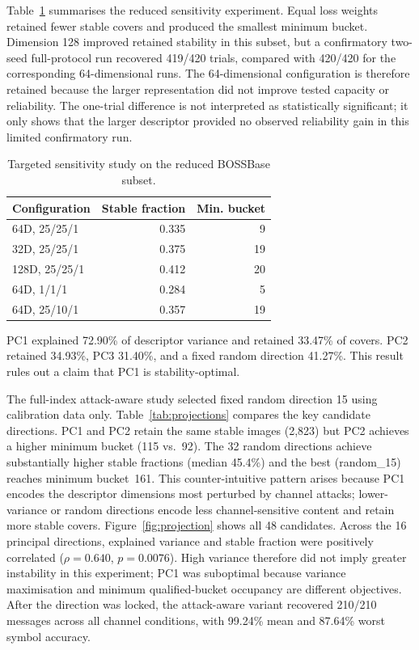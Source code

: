 ﻿\documentclass[a4paper,fleqn]{cas-dc}
\begin{document}
Table~\ref{tab:sensitivity} summarises the reduced sensitivity experiment.
Equal loss weights retained fewer stable covers and produced the smallest
minimum bucket. Dimension 128 improved retained stability in this subset, but
a confirmatory two-seed full-protocol run recovered 419/420 trials, compared
with 420/420 for the corresponding 64-dimensional runs. The 64-dimensional
configuration is therefore retained because the larger representation did not
improve tested capacity or reliability. The one-trial difference is not
interpreted as statistically significant; it only shows that the larger
descriptor provided no observed reliability gain in this limited confirmatory
run.

\begin{table}[t]
\centering
\caption{Targeted sensitivity study on the reduced BOSSBase subset.}
\label{tab:sensitivity}
\begin{tabular}{lrr}
\toprule
Configuration & Stable fraction & Min. bucket\\
\midrule
64D, 25/25/1 & 0.335 & 9\\
32D, 25/25/1 & 0.375 & 19\\
128D, 25/25/1 & 0.412 & 20\\
64D, 1/1/1 & 0.284 & 5\\
64D, 25/10/1 & 0.357 & 19\\
\bottomrule
\end{tabular}
\end{table}

PC1 explained 72.90\% of descriptor variance and retained 33.47\% of covers.
PC2 retained 34.93\%, PC3 31.40\%, and a fixed random direction 41.27\%.
This result rules out a claim that PC1 is stability-optimal.

The full-index attack-aware study selected fixed random direction 15 using
calibration data only. Table~\ref{tab:projections} compares the key
candidate directions. PC1 and PC2 retain the same stable images (2{,}823)
but PC2 achieves a higher minimum bucket (115 vs.\ 92). The 32 random
directions achieve substantially higher stable fractions (median 45.4\%)
and the best (random\_15) reaches minimum bucket~161. This counter-intuitive
pattern arises because PC1 encodes the descriptor dimensions most perturbed
by channel attacks; lower-variance or random directions encode less
channel-sensitive content and retain more stable covers.
Figure~\ref{fig:projection} shows all 48 candidates. Across the 16 principal
directions, explained variance and stable fraction were positively correlated
($\rho=0.640$, $p=0.0076$). High variance therefore did not imply greater
instability in this experiment; PC1 was suboptimal because variance
maximisation and minimum qualified-bucket occupancy are different objectives.
After the direction was locked, the attack-aware variant recovered 210/210
messages across all channel conditions, with 99.24\% mean and 87.64\% worst
symbol accuracy.
\end{document}
